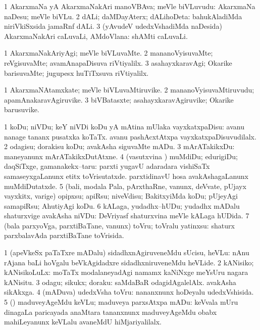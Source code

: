 \bentry
{}
\gl{\nA}
\bmng
\bnum
\num{1} AkarxmaNa yA AkarxmaNakAri manoVBAva; meVle biVLuvudu:  AkarxmaNa naDesu; meVle biVLu. 
\num{2} dALi; daMDayAterx; dALihoDeta:  bahukAladiMda niriVkiSxsida jamaRnf dALi. 
\num{3} (yAvudeV udedxVshadiMda naDesida) AkarxmaNakAri caLuvaLi, AMdoVlana:  shAMti caLuvaLi. 
\enum
\emng
\eentry

\bentry
{}
\gl{\kirxvi}
\bmng
\bnum
\num{1} AkarxmaNakAriyAgi; meVle biVLuvaMte. 
\num{2} mananoVyisuvaMte; reVgisuvaMte; avamAnapaDisuva riVtiyalilx. 
\num{3} asahayxkaravAgi; Okarike barisuvaMte; jugupesx huTiTxsuva riVtiyalilx. 
\enum
\emng
\eentry

\bentry
{}
\gl{\nA}
\bmng
\bnum
\num{1} AkarxmaNAtamxkate; meVle biVLuvaMtiruvike. 
\num{2} mananoVyisuvaMtiruvudu; apamAnakaravAgiruvike. 
\num{3} biVBatasxte; asahayxkaravAgiruvike; Okarike barusuvike. 
\enum
\emng
\eentry

\bentry
{}
\gl{\sakirx}
\bmng
\bnum
\num{1} koDu; niVDu; keY niVDi koDu yA mAtina mUlaka vayxkatxpaDisu:  avanu nanage tananx pusatxka koTaTx.  avanu pashAcxtAtxpa vayxkatxpaDisuvudilalx. 
\num{2} odagisu; dorakisu koDu; avakAsha siguvaMte mADu. 
\num{3} mArATakikxDu:  maneyanunx mArATakikxDutAtxne. 
\num{4} (vasutxvina \vi) muMdiDu; edurigiDu; daqSiTxge, gamanakekx--taru:  parxti yugavU adaradara vishiSaTx samaseyxgaLanunx etitx toVrisutatxde.  parxtidinavU hosa avakAshagaLanunx muMdiDutatxde. 
\num{5} (bali, modala Pala, pArxthaRne, \mo vanunx, deVvate, pUjayx vayxkitx, \mo varige) opipxsu; apiRsu; niveVdisu; BakitxyiMda koDu; pUjeyAgi samapiRsu; AhutiyAgi koDu. 
\num{6} kALaga, yudadhx--hUDu; yudadhx mADalu shaturxvige avakAsha niVDu:  DeVriyasf shaturxvina meVle kALaga hUDida. 
\num{7} (bala parxyoVga, parxtiBaTane, \mo vanunx) toVru; toVralu yatinxsu:  shaturx parxbalavAda parxtiBaTane toVrisida. 
\enum
\emng

\noindent
\gl{\akirx}
\bmng
\bnum
\num{1} (apeVkeSx paTaTxre mADalu) sidadhxnAgiruveneMdu sUcisu, heVLu:  nAnu rAjana baLi hoVgalu beVkAgidadxre sidadhxniruveneMdu heVLide. 
\num{2} kANisiko; kANisikoLuLx:  moTaTx modalaneyadAgi namamx kaNiNxge meYsUru nagara kANisitu. 
\num{3} odagu; sikukx; doraku:  saMdaBaR odagidAgalelAlx.  avakAsha sikAkxga. 
\num{4} (mADuva) udedxVsha toVru:  nananxnunx hoDeyalu udedxVshisida. 
\num{5} (\pArxparx) maduveyAgeMdu keVLu; maduveya parxsAtxpa mADu:  keVvala mUru dinagaLa paricayada anaMtara tananxnunx maduveyAgeMdu obabx mahiLeyanunx keVLalu avaneMdU hiMjariyalilalx. 
\enum
\emng

